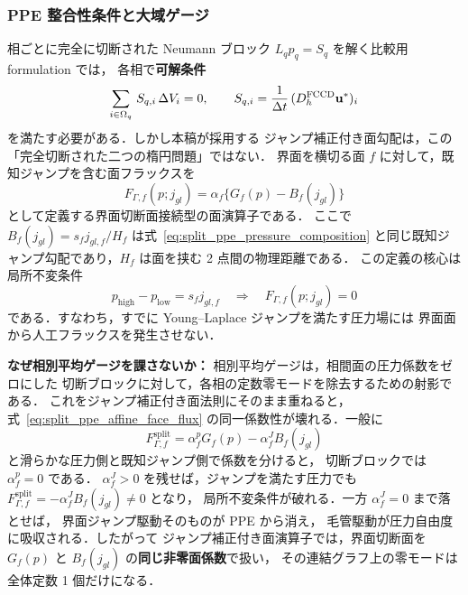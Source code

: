 \subsubsection{PPE 整合性条件と大域ゲージ}
\label{sec:ppe_phase_gauge_pin}

相ごとに完全に切断された Neumann ブロック
$L_qp_q=S_q$ を解く比較用 formulation では，
各相で\textbf{可解条件}
\begin{equation}
  \sum_{i\in\Omega_q}\,S_{q,i}\,\Delta V_i = 0,
  \qquad S_{q,i} = \frac{1}{\Delta t}\,(D_h^{\mathrm{FCCD}} \mathbf{u}^*)_i
  \label{eq:split_ppe_compatibility}
\end{equation}
を満たす必要がある．しかし本稿が採用する
ジャンプ補正付き面勾配は，この「完全切断された二つの楕円問題」ではない．
界面を横切る面 $f$ に対して，既知ジャンプを含む面フラックスを
\begin{equation}
  F_{\Gamma,f}(p;j_{gl})
  =
  \alpha_f\{G_f(p)-B_f(j_{gl})\}
  \label{eq:split_ppe_affine_face_flux}
\end{equation}
として定義する界面切断面接続型の面演算子である．
ここで $B_f(j_{gl})=s_fj_{gl,f}/H_f$ は式~\eqref{eq:split_ppe_pressure_composition}
と同じ既知ジャンプ勾配であり，$H_f$ は面を挟む 2 点間の物理距離である．
この定義の核心は局所不変条件
\[
  p_\mathrm{high}-p_\mathrm{low}=s_f j_{gl,f}
  \quad\Longrightarrow\quad
  F_{\Gamma,f}(p;j_{gl})=0
\]
である．すなわち，すでに Young--Laplace ジャンプを満たす圧力場には
界面面から人工フラックスを発生させない．

\noindent\textbf{なぜ相別平均ゲージを課さないか：}
相別平均ゲージは，相間面の圧力係数をゼロにした
切断ブロックに対して，各相の定数零モードを除去するための射影である．
これをジャンプ補正付き面法則にそのまま重ねると，式~\eqref{eq:split_ppe_affine_face_flux}
の同一係数性が壊れる．一般に
\[
  F^{\mathrm{split}}_{\Gamma,f}
  =
  \alpha^p_fG_f(p)-\alpha^J_fB_f(j_{gl})
\]
と滑らかな圧力側と既知ジャンプ側で係数を分けると，
切断ブロックでは $\alpha^p_f=0$ である．
$\alpha^J_f>0$ を残せば，ジャンプを満たす圧力でも
$F^{\mathrm{split}}_{\Gamma,f}=-\alpha^J_fB_f(j_{gl})\neq0$ となり，
局所不変条件が破れる．一方 $\alpha^J_f=0$ まで落とせば，
界面ジャンプ駆動そのものが PPE から消え，
毛管駆動が圧力自由度に吸収される．したがって
ジャンプ補正付き面演算子では，界面切断面を
$G_f(p)$ と $B_f(j_{gl})$ の\textbf{同じ非零面係数}で扱い，
その連結グラフ上の零モードは全体定数 1 個だけになる．


